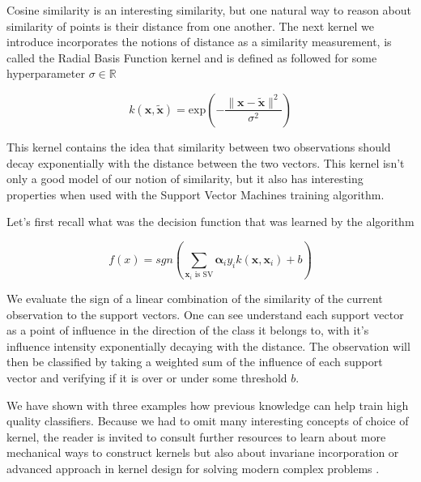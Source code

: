 Cosine similarity is an interesting similarity, but one natural way to reason about similarity of points is their distance from one another. The next kernel we introduce incorporates the notions of distance as a similarity measurement, is called the Radial Basis Function kernel and is defined as followed for some hyperparameter $\sigma \in \mathbb{R}$

\begin{equation*}
  k(\mathbf{x}, \mathbf{\tilde{x}}) = \text{exp}\left(-\frac{\|\mathbf{x} - \mathbf{\tilde{x}}\|^2}{\sigma^2}\right)
\end{equation*}

This kernel contains the idea that similarity between two observations should decay exponentially with the distance between the two vectors. This kernel isn't only a good model of our notion of similarity, but it also has interesting properties when used with the Support Vector Machines training algorithm.

Let's first recall what was the decision function that was learned by the algorithm

\begin{equation*}
  f\left(x\right) = sgn\left(\sum_{\mathbf{x}_i \text{ is SV}}\boldsymbol{\alpha}_iy_ik\left(\mathbf{x}, \mathbf{x}_i\right) + b\right)
\end{equation*}

We evaluate the sign of a linear combination of the similarity of the current observation to the support vectors. One can see understand each support vector as a point of influence in the direction of the class it belongs to, with it's influence intensity exponentially decaying with the distance. The observation will then be classified by taking a weighted sum of the influence of each support vector and verifying if it is over or under some threshold $b$.

We have shown with three examples how previous knowledge can help train high quality classifiers. Because we had to omit many interesting concepts of choice of kernel, the reader is invited to consult further resources to learn about more mechanical ways to construct kernels \cite{Scholkopf:2001:LKS:559923} but also about invariane incorporation \cite{Decoste2002} or advanced approach in kernel design for solving modern complex problems \cite{lauer:hal}.

